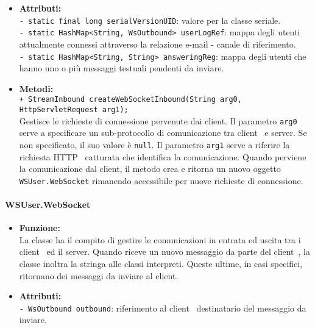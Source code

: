 {{\begin{sloppypar}
{{{\begin{itemize}
				\item[] \textbf{Attributi:}{\\
					\texttt{- static final long serialVersionUID}: valore per la classe seriale.\\
					
					\texttt{- static HashMap<String, WsOutbound> userLogRef}: mappa degli utenti attualmente connessi attraverso la relazione e-mail - canale di riferimento.\\
					
					\texttt{- static HashMap<String, String> answeringReg}: mappa degli utenti che hanno uno o più messaggi testuali pendenti da inviare.\\
					}
			
				\item[] \textbf{Metodi:}{\\
					\texttt{+ StreamInbound createWebSocketInbound(String arg0, HttpServletRequest arg1);}\\
					Gestisce le richieste di connessione pervenute dai client\g.
					Il parametro \texttt{arg0} serve a specificare un sub-protocollo di comunicazione tra client\g~ e server\g. Se non specificato, il suo valore è \texttt{null}.
					Il parametro \texttt{arg1} serve a riferire la richiesta HTTP\g~ catturata che identifica la comunicazione.
					Quando perviene la comunicazione dal client\g, il metodo crea e ritorna un nuovo oggetto \texttt{WSUser.WebSocket} rimanendo accessibile per nuove richieste di connessione.\\	
				}
			\end{itemize}
		}

		\paragraph{WSUser.WebSocket}\label{par:WSUserWebSocket}{
			\begin{itemize}
				\item[] \textbf{Funzione:}\\
					La classe ha il compito di gestire le comunicazioni in entrata ed uscita tra i client\g~ ed il server\g.
					Quando riceve un nuovo messaggio da parte del client\g~, la classe inoltra la stringa alle classi interpreti. Queste ultime, in casi specifici, ritornano dei messaggi da inviare al client\g.\\
				
				\item[] \textbf{Attributi:}{\\
					\texttt{- WsOutbound outbound}: riferimento al client\g~ destinatario del messaggio da inviare.\\
					
}
\end{itemize}}}}
\end{sloppypar}}}
